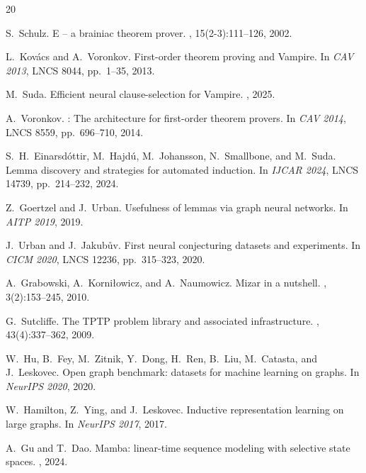 \documentclass{easychair}
\begin{document}

\begin{thebibliography}{20}

S.~Schulz.
\newblock E -- a brainiac theorem prover.
, 15(2-3):111--126, 2002.

L.~Kov{\'a}cs and A.~Voronkov.
\newblock First-order theorem proving and {V}ampire.
\newblock In {\em CAV 2013}, LNCS 8044, pp.~1--35, 2013.

M.~Suda.
\newblock Efficient neural clause-selection for {V}ampire.
, 2025.

A.~Voronkov.
: The architecture for first-order theorem provers.
\newblock In {\em CAV 2014}, LNCS 8559, pp.~696--710, 2014.

S.~H.~Einarsd{\'o}ttir, M.~Hajd{\'u}, M.~Johansson, N.~Smallbone,
  and M.~Suda.
\newblock Lemma discovery and strategies for automated induction.
\newblock In {\em IJCAR 2024}, LNCS 14739, pp.~214--232, 2024.

Z.~Goertzel and J.~Urban.
\newblock Usefulness of lemmas via graph neural networks.
\newblock In {\em AITP 2019}, 2019.

J.~Urban and J.~Jakub\r{u}v.
\newblock First neural conjecturing datasets and experiments.
\newblock In {\em CICM 2020}, LNCS 12236, pp.~315--323, 2020.

A.~Grabowski, A.~Korni{\l}owicz, and A.~Naumowicz.
\newblock Mizar in a nutshell.
, 3(2):153--245, 2010.

G.~Sutcliffe.
\newblock The {TPTP} problem library and associated infrastructure.
, 43(4):337--362, 2009.

W.~Hu, B.~Fey, M.~Zitnik, Y.~Dong, H.~Ren, B.~Liu, M.~Catasta, and
  J.~Leskovec.
\newblock Open graph benchmark: datasets for machine learning on graphs.
\newblock In {\em NeurIPS 2020}, 2020.

W.~Hamilton, Z.~Ying, and J.~Leskovec.
\newblock Inductive representation learning on large graphs.
\newblock In {\em NeurIPS 2017}, 2017.

A.~Gu and T.~Dao.
\newblock Mamba: linear-time sequence modeling with selective state spaces.
, 2024.


\end{thebibliography}
\end{document}
